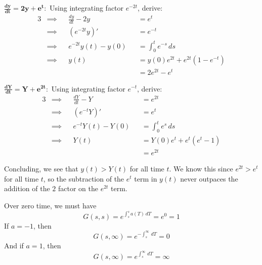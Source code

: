 \documentclass[a4paper]{article}
\begin{document}
\(\bm{\frac{d y}{d t}  = 2y + e^{t}:}\) Using integrating factor \(e^{-2t}\), derive:
\begin{alignat*}{3}
	&\implies && \frac{d y}{d t} - 2y && = e^{t} \\
	&\implies && \!\left( e^{-2t}y \right)' && = e^{-t}  \\
	&\implies && e^{-2t} y \!\left( t \right) - y \!\left( 0 \right) && = \int^{t}_{0} e^{-s} \, ds \\
	&\implies && y \!\left( t \right) && = y \!\left( 0 \right) e^{2t} + e^{2t} \!\left( 1 - e^{-t} \right) \\
	& && && = 2e^{2t} - e^{t}
\end{alignat*}

\(\bm{\frac{d Y}{d t}  = Y + e^{2t}}:\) Using integrating factor \(e^{-t}\), derive:
\begin{alignat*}{3}
	&\implies && \frac{d Y}{d t} - Y && = e^{2t}  \\
	&\implies && \!\left( e^{-t}Y \right)' && = e^{t} \\ 
	&\implies && e^{-t} Y \!\left( t \right) - Y \!\left( 0 \right) && = \int^{t}_{0} e^{s} \, ds \\
	&\implies && Y \!\left( t \right) && = Y \!\left( 0 \right) e^{t} + e^{t} \!\left( e^{t} - 1 \right) \\
	& && && = e^{2t}
\end{alignat*}

Concluding, we see that \(y \!\left( t \right) > Y \!\left( t \right) \) for all time \(t\). We know this since \(e^{2t} > e^{t}\) for all time \(t\), so the subtraction of the \(e^{t}\) term in \(y \!\left( t \right) \) never outpaces the addition of the \(2\) factor on the \(e^{2t}\) term.

\vspace{12pt}


Over zero time, we must have
\[
	G \!\left( s,s \right) = e^{\int^{s}_{s} a \!\left( T \right)  \, dT } = e^{0} = 1
\]
If \(a = -1\), then
\[
	G \!\left( s, \infty \right) = e^{-\int^{\infty}_{s}  \, dT } = 0
\]
And if \(a = 1\), then
\[
	G \!\left( s, \infty \right) = e^{\int^{\infty}_{s}  \, dT } = \infty
\]

\end{document}

